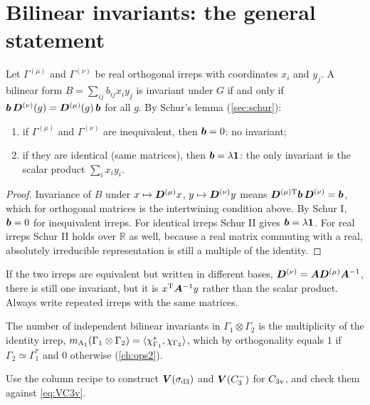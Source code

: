 \section{Bilinear invariants: the general statement}\label{sec:bilinear}

\begin{theorem}\label{thm:bilinear}
Let $\Gamma^{(\mu)}$ and $\Gamma^{(\nu)}$ be real orthogonal irreps with coordinates
$x_i$ and $y_j$. A bilinear form $B=\sum_{ij}b_{ij}x_iy_j$ is invariant under $G$ if and
only if $\bm{b}\,\bm{D}^{(\nu)}(g)=\bm{D}^{(\mu)}(g)\,\bm{b}$ for all $g$. By
Schur's lemma (\cref{sec:schur}):
\begin{enumerate}
\item if $\Gamma^{(\mu)}$ and $\Gamma^{(\nu)}$ are inequivalent, then $\bm{b}=0$: no
      invariant;
\item if they are identical (same matrices), then $\bm{b}=\lambda\bm{1}$: the only
      invariant is the scalar product $\sum_ix_iy_i$.
\end{enumerate}
\end{theorem}
\begin{proof}
Invariance of $B$ under $x\mapsto\bm{D}^{(\mu)}x$, $y\mapsto\bm{D}^{(\nu)}y$ means
$\bm{D}^{(\mu)\mathrm{T}}\bm{b}\,\bm{D}^{(\nu)}=\bm{b}$, which for orthogonal
matrices is the intertwining condition above. By Schur I, $\bm{b}=0$ for
inequivalent irreps. For identical irreps Schur II gives $\bm{b}=\lambda\bm{1}$. For real
irreps Schur II holds over $\mathbb{R}$ as well, because a real matrix commuting with a
real, absolutely irreducible representation is still a multiple of the identity.
\end{proof}
If the two irreps are equivalent but
written in different bases, $\bm{D}^{(\nu)}=\bm{A}\bm{D}^{(\mu)}\bm{A}^{-1}$,
there is still one invariant, but it is $x^{\mathrm{T}}\bm{A}^{-1}y$ rather than the scalar
product. Always write repeated irreps with the same matrices.

The number of independent bilinear invariants in $\Gamma_1\otimes\Gamma_2$ is the
multiplicity of the identity irrep, $m_{\mathrm{A}_1}(\Gamma_1\otimes\Gamma_2)=
\langle \chi_{\Gamma_1}^{*}, \chi_{\Gamma_2}\rangle$, which by orthogonality equals $1$ if
$\Gamma_2\simeq\Gamma_1^{*}$ and $0$ otherwise (\cref{ch:ops2}).

\exercisesection

\begin{exercise}\label{ex:3:sigma3}
Use the column recipe to construct $\bm{V}(\sigma_{\mathrm{d}3})$ and
$\bm{V}(C_3^-)$ for $C_{3\mathrm{v}}$, and check them against \eqref{eq:VC3v}.
\end{exercise}

